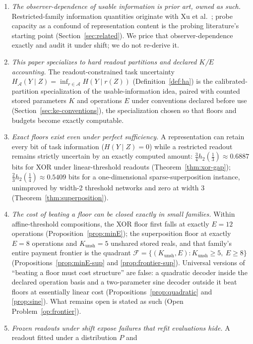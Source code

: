 \documentclass[twocolumn,10pt]{article}
\theoremstyle{definition}
\theoremstyle{remark}
\newcommand{\cA}{\mathcal{A}}
\newcommand{\cF}{\mathcal{F}}
\newcommand{\hb}{h_2}
\newcommand{\Kunsh}{K_{\mathrm{unsh}}}
\begin{document}
\begin{enumerate}
\item \emph{The observer-dependence of usable information is prior
art, owned as such.} Restricted-family information quantities
originate with Xu et al.~\cite{xuvinfo}; probe capacity as a confound
of representation content is the probing literature's starting point
(Section~\ref{sec:related}). We price that observer-dependence
exactly and audit it under shift; we do not re-derive it.
\item \emph{This paper specializes to hard readout partitions and
declared $K$/$E$ accounting.} The readout-constrained task
uncertainty $H_{\cA}(Y \mid Z) = \inf_{r \in \cA} H(Y \mid r(Z))$
(Definition~\ref{def:ha}) is the calibrated-partition specialization
of the usable-information idea, paired with counted stored parameters
$K$ and operations $E$ under conventions declared before use
(Section~\ref{sec:ke-conventions}), the specialization chosen so
that floors and budgets become exactly computable.
\item \emph{Exact floors exist even under perfect sufficiency.} A
representation can retain every bit of task information
($H(Y \mid Z) = 0$) while a restricted readout remains strictly
uncertain by an exactly computed amount:
$\tfrac34 \hb(\tfrac13) \approx 0.6887$ bits for XOR under
linear-threshold readouts (Theorem~\ref{thm:xor-gap});
$\tfrac23 \hb(\tfrac14) \approx 0.5409$ bits for a one-dimensional
sparse-superposition instance, unimproved by width-2 threshold
networks and zero at width 3 (Theorem~\ref{thm:superposition}).
\item \emph{The cost of beating a floor can be closed exactly in
small families.} Within affine-threshold compositions, the XOR floor
first falls at exactly $E = 12$ operations
(Proposition~\ref{prop:minE}); the superposition floor at exactly
$E = 8$ operations and $\Kunsh = 5$ unshared stored reals, and that
family's entire payment frontier is the quadrant
$\cF = \{(\Kunsh, E) : \Kunsh \ge 5,\ E \ge 8\}$
(Propositions~\ref{prop:minE-sup} and \ref{prop:frontier-sup}).
Universal versions of ``beating a floor must cost structure'' are
false: a quadratic decoder inside the declared operation basis and a
two-parameter sine decoder outside it beat floors at essentially
linear cost (Propositions~\ref{prop:quadratic} and \ref{prop:sine}).
What remains open is stated as such
(Open Problem~\ref{op:frontier}).
\item \emph{Frozen readouts under shift expose failures that refit
evaluations hide.} A readout fitted under a distribution $P$ and

\end{enumerate}
\end{document}
